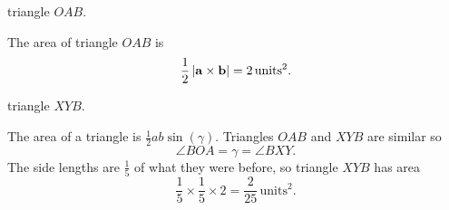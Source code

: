 \begin{parts}
\begin{subparts}

\subpart[1]
triangle $OAB$.

\begin{EnvFullwidth}
\begin{solutionorgrid}[1in]
The area of triangle $OAB$ is
\[
    \frac{1}{2}\left|{\mathbf{a} \times \mathbf{b}}\right| = 2 \, \textrm{units}^2.
\]
\end{solutionorgrid}
\end{EnvFullwidth}

\subpart[2]
triangle $XYB$.

\begin{EnvFullwidth}
\begin{solutionorgrid}[1.5in]
The area of a triangle is $\frac{1}{2}ab\sin(\gamma)$. Triangles $OAB$ and $XYB$ are similar so
\[
    \angle{BOA} = \gamma = \angle{BXY}.
\]
The side lengths are $\frac{1}{5}$ of what they were before, so triangle $XYB$ has area
\[
    \frac{1}{5} \times \frac{1}{5} \times 2 = \frac{2}{25} \, \textrm{units}^2.
\]
\end{solutionorgrid}
\end{EnvFullwidth}

\end{subparts}

\end{parts}
